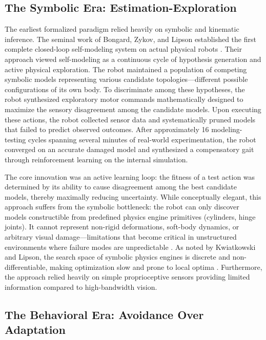 \documentclass[12pt,a4paper,oneside]{report}
\begin{document}
\subsection{The Symbolic Era: Estimation-Exploration}

The earliest formalized paradigm relied heavily on symbolic and kinematic inference. The seminal work of Bongard, Zykov, and Lipson established the first complete closed-loop self-modeling system on actual physical robots \cite{bongard2006resilient}. Their approach viewed self-modeling as a continuous cycle of hypothesis generation and active physical exploration. The robot maintained a population of competing symbolic models representing various candidate topologies—different possible configurations of its own body. To discriminate among these hypotheses, the robot synthesized exploratory motor commands mathematically designed to maximize the sensory disagreement among the candidate models. Upon executing these actions, the robot collected sensor data and systematically pruned models that failed to predict observed outcomes. After approximately 16 modeling-testing cycles spanning several minutes of real-world experimentation, the robot converged on an accurate damaged model and synthesized a compensatory gait through reinforcement learning on the internal simulation.

The core innovation was an active learning loop: the fitness of a test action was determined by its ability to cause disagreement among the best candidate models, thereby maximally reducing uncertainty. While conceptually elegant, this approach suffers from the symbolic bottleneck: the robot can only discover models constructible from predefined physics engine primitives (cylinders, hinge joints). It cannot represent non-rigid deformations, soft-body dynamics, or arbitrary visual damage—limitations that become critical in unstructured environments where failure modes are unpredictable \cite{kwiatkowski2019task}. As noted by Kwiatkowski and Lipson, the search space of symbolic physics engines is discrete and non-differentiable, making optimization slow and prone to local optima \cite{kwiatkowski2019task}. Furthermore, the approach relied heavily on simple proprioceptive sensors providing limited information compared to high-bandwidth vision.

\subsection{The Behavioral Era: Avoidance Over Adaptation}
\end{document}
